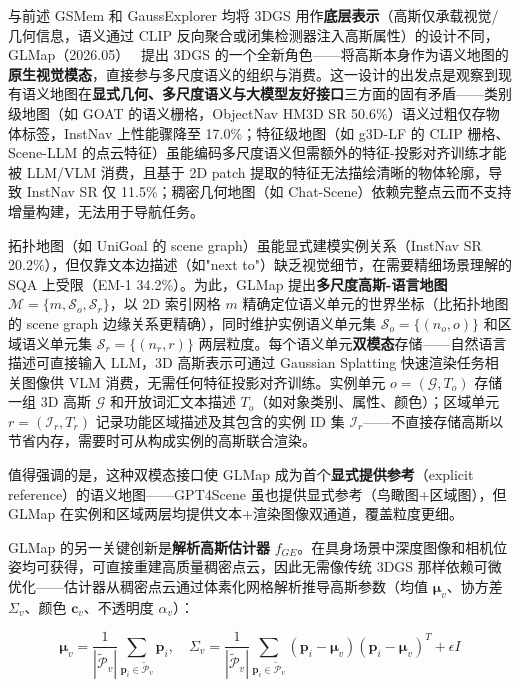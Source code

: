 与前述 GSMem 和 GaussExplorer 均将 3DGS 用作\textbf{底层表示}（高斯仅承载视觉/几何信息，语义通过 CLIP 反向聚合或闭集检测器注入高斯属性）的设计不同，GLMap（2026.05）~\cite{2605_01736} 提出 3DGS 的一个全新角色——将高斯本身作为语义地图的\textbf{原生视觉模态}，直接参与多尺度语义的组织与消费。这一设计的出发点是观察到现有语义地图在\textbf{显式几何、多尺度语义与大模型友好接口}三方面的固有矛盾——类别级地图（如 GOAT 的语义栅格，ObjectNav HM3D SR 50.6\%）语义过粗仅存物体标签，InstNav 上性能骤降至 17.0\%；特征级地图（如 g3D-LF 的 CLIP 栅格、Scene-LLM 的点云特征）虽能编码多尺度语义但需额外的特征-投影对齐训练才能被 LLM/VLM 消费，且基于 2D patch 提取的特征无法描绘清晰的物体轮廓，导致 InstNav SR 仅 11.5\%；稠密几何地图（如 Chat-Scene）依赖完整点云而不支持增量构建，无法用于导航任务。

拓扑地图（如 UniGoal 的 scene graph）虽能显式建模实例关系（InstNav SR 20.2\%），但仅靠文本边描述（如"next to"）缺乏视觉细节，在需要精细场景理解的 SQA 上受限（EM-1 34.2\%）。为此，GLMap 提出\textbf{多尺度高斯-语言地图} $\mathcal{M} = \{m, \mathcal{S}_o, \mathcal{S}_r\}$，以 2D 索引网格 $m$ 精确定位语义单元的世界坐标（比拓扑地图的 scene graph 边缘关系更精确），同时维护实例语义单元集 $\mathcal{S}_o = \{(n_o, o)\}$ 和区域语义单元集 $\mathcal{S}_r = \{(n_r, r)\}$ 两层粒度。每个语义单元\textbf{双模态}存储——自然语言描述可直接输入 LLM，3D 高斯表示可通过 Gaussian Splatting 快速渲染任务相关图像供 VLM 消费，无需任何特征投影对齐训练。实例单元 $o = (\mathcal{G}, T_o)$ 存储一组 3D 高斯 $\mathcal{G}$ 和开放词汇文本描述 $T_o$（如对象类别、属性、颜色）；区域单元 $r = (\mathcal{I}_r, T_r)$ 记录功能区域描述及其包含的实例 ID 集 $\mathcal{I}_r$——不直接存储高斯以节省内存，需要时可从构成实例的高斯联合渲染。

值得强调的是，这种双模态接口使 GLMap 成为首个\textbf{显式提供参考}（explicit reference）的语义地图——GPT4Scene 虽也提供显式参考（鸟瞰图+区域图），但 GLMap 在实例和区域两层均提供文本+渲染图像双通道，覆盖粒度更细。

GLMap 的另一关键创新是\textbf{解析高斯估计器} $f_{GE}$。在具身场景中深度图像和相机位姿均可获得，可直接重建高质量稠密点云，因此无需像传统 3DGS 那样依赖可微优化——估计器从稠密点云通过体素化网格解析推导高斯参数（均值 $\boldsymbol{\mu}_v$、协方差 $\Sigma_v$、颜色 $\mathbf{c}_v$、不透明度 $\alpha_v$）：

\begin{equation}
\boldsymbol{\mu}_v = \frac{1}{|\tilde{\mathcal{P}}_v|}\sum_{\mathbf{p}_i \in \tilde{\mathcal{P}}_v} \mathbf{p}_i, \quad \Sigma_v = \frac{1}{|\tilde{\mathcal{P}}_v|}\sum_{\mathbf{p}_i \in \tilde{\mathcal{P}}_v}(\mathbf{p}_i - \boldsymbol{\mu}_v)(\mathbf{p}_i - \boldsymbol{\mu}_v)^T + \epsilon I
\end{equation}

